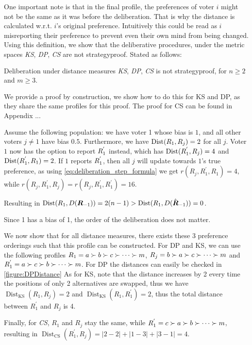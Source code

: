 One important note is that in the final profile, the preferences of voter \(i\) might not be the same as it was before the deliberation. That is why the distance is calculated w.r.t. \(i\)'s original preference. Intuitively this could be read as \(i\) misreporting their preference to prevent even their own mind from being changed.
Using this definition, we show that the deliberative procedures, under the metric spaces \textit{KS}, \textit{ DP}, \textit{ CS} are not strategyproof. Stated as follows:

\begin{proposition}
	Deliberation under distance measures \textit{KS}, \textit{ DP}, \textit{ CS} is not strategyproof, for $n \geq 2$ and $m \geq 3$.
\end{proposition}
We provide a proof by construction, we show how to do this for KS and DP, as they share the same profiles for this proof. The proof for CS can be found in Appendix ...
\begin{proofc}
	Assume the following population: we have voter 1 whose bias is $1$, and all other voters $j \neq 1$ have bias $0.5$. Furthermore, we have $\operatorname{Dist}(R_1, R_j) = 2$ for all $j$. Voter $1$ now has the option to report $R_{1}^{'}$ instead, which has $\operatorname{Dist}(R_{1}^{'}, R_j) = 4$ and $\operatorname{Dist}(R_{1}^{'}, R_1) = 2$. If $1$ reports $R_1^{'}$, then all $j$ will update towards $1$'s true preference, as using \cref{eq:deliberation_step_formula} we get $r(R_{j}, R_{1}^{'}, R_1) = 4$, while $r(R_{j}, R_{1}^{'}, R_j) = r(R_{j}, R_{1}^{'}, R_1^{'}) = 16$.

	Resulting in $\operatorname{Dist}(R_{1}, D(\boldsymbol{R}_{-1})) = 2(n-1) >  \operatorname{Dist}(R_{1}, D(\hat{\boldsymbol{R}}_{-1})) = 0$.

	Since 1 has a bias of 1, the order of the deliberation does not matter.

	We now show that for all distance measures, there exists these 3 preference orderings such that this profile can be constructed. For DP and KS, we can use the following profiles $R_{1}  = a \succ b \succ c \succ \cdots \succ m$, $R_{j} = b \succ a \succ c \succ \cdots \succ m$ and $R^{'}_{1} = a \succ c \succ b \succ \cdots \succ m$. For DP the distances can easily be checked in \cref{figure:DPDistance} As for KS, note that the distance increases by 2 every time the positions of only 2 alternatives are swapped, thus we have $\operatorname{Dist}_{\text{KS}}(R_{1}, R_{j}) = 2$ and $\operatorname{Dist}_{\text{KS}}(R_{1}, R_{1}^{'}) = 2$, thus the total distance between $R_{1}^{'}$ and $R_{j}$ is 4.

	Finally, for \textit{CS}, $R_{1}$ and $R_{j}$ stay the same, while $R_{1}^{'} = c \succ a \succ b \succ \cdots \succ m$, resulting in $\operatorname{Dist}_{\text{CS}}(R_{1}^{'}, R_{j}) = |2-2| + |1-3| + |3-1| = 4$.
\end{proofc}

